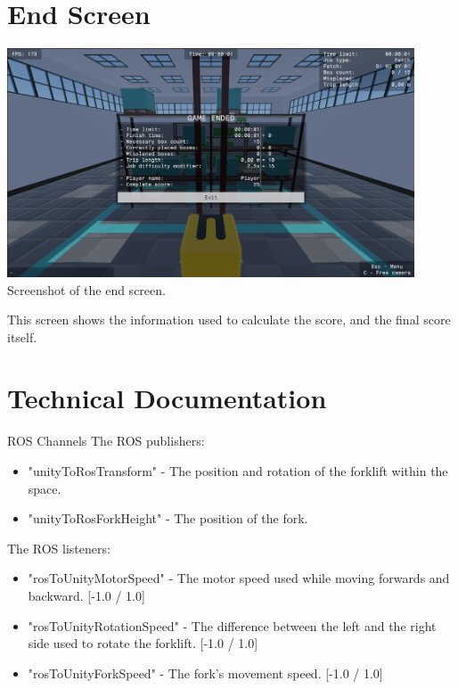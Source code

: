 \documentclass{article}
\begin{document}
\pagebreak

\section{End Screen}
\begin{center}
    \includegraphics[width=12.1cm]{end_screen}\linebreak
    \small Screenshot of the end screen.
\end{center}

\normalsize
This screen shows the information used to calculate the score, and the final score itself.

\pagebreak

\section{Technical Documentation}
\vspace{0.25cm}
\Large \>ROS Channels \vspace{0.5cm}
\newline
\normalsize The ROS publishers:
\begin{itemize}
    \item "unityToRosTransform" - The position and rotation of the forklift within the space.
    \item "unityToRosForkHeight" - The position of the fork.
\end{itemize}
The ROS listeners:
\begin{itemize}
    \item "rosToUnityMotorSpeed" - The motor speed used while moving forwards and backward. [-1.0 / 1.0]
    \item "rosToUnityRotationSpeed" - The difference between the left and the right side used to rotate the forklift. [-1.0 / 1.0]
    \item "rosToUnityForkSpeed" - The fork's movement speed. [-1.0 / 1.0]
\end{itemize}
\end{document}
